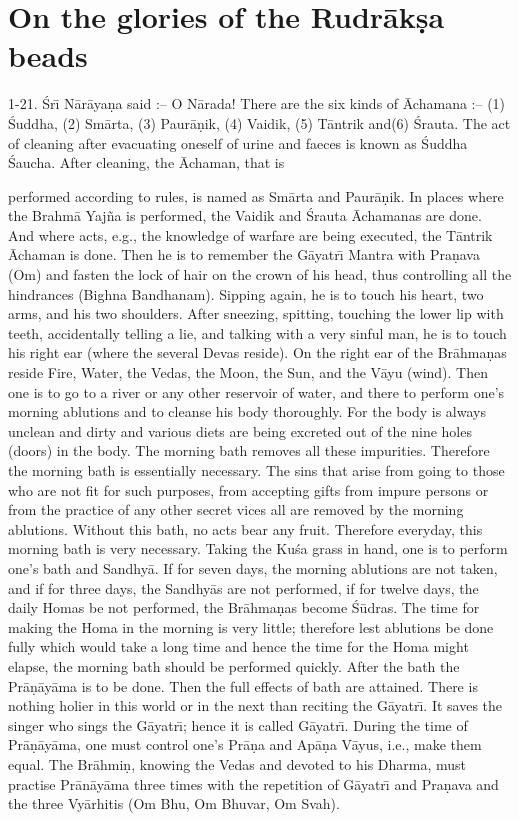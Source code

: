 \chapter{On the glories of the Rudr\=ak\d{s}a beads}

1-21. \'Sr\={\i} N\=ar\=aya\d{n}a said :-- O N\=arada! There are the six kinds of \=Achamana :-- (1) \'Suddha, (2) Sm\=arta, (3) Paur\=a\d{n}ik, (4) Vaidik, (5) T\=antrik and(6) \'Srauta. The act of cleaning after evacuating oneself of urine and faeces is known as \'Suddha \'Saucha. After cleaning, the \=Achaman, that is

performed according to rules, is named as Sm\=arta and Paur\=a\d{n}ik. In places where the Brahm\=a Yaj\~na is performed, the Vaidik and \'Srauta \=Achamanas are done. And where acts, e.g., the knowledge of warfare are being executed, the T\=antrik \=Achaman is done. Then he is to remember the G\=ayatr\={\i} Mantra with Pra\d{n}ava (Om) and fasten the lock of hair on the crown of his head, thus controlling all the hindrances (Bighna Bandhanam). Sipping again, he is to touch his heart, two arms, and his two shoulders. After sneezing, spitting, touching the lower lip with teeth, accidentally telling a lie, and talking with a very sinful man, he is to touch his right ear (where the several Devas reside). On the right ear of the Br\=ahma\d{n}as reside Fire, Water, the Vedas, the Moon, the Sun, and the V\=ayu (wind). Then one is to go to a river or any other reservoir of water, and there to perform one's morning ablutions and to cleanse his body thoroughly. For the body is always unclean and dirty and various diets are being excreted out of the nine holes (doors) in the body. The morning bath removes all these impurities. Therefore the morning bath is essentially necessary. The sins that arise from going to those who are not fit for such purposes, from accepting gifts from impure persons or from the practice of any other secret vices all are removed by the morning ablutions. Without this bath, no acts bear any fruit. Therefore everyday, this morning bath is very necessary. Taking the Ku\'sa grass in hand, one is to perform one's bath and Sandhy\=a. If for seven days, the morning ablutions are not taken, and if for three days, the Sandhy\=as are not performed, if for twelve days, the daily Homas be not performed, the Br\=ahma\d{n}as become \'S\=udras. The time for making the Homa in the morning is very little; therefore lest ablutions be done fully which would take a long time and hence the time for the Homa might elapse, the morning bath should be performed quickly. After the bath the Pr\=a\d{n}\=ay\=ama is to be done. Then the full effects of bath are attained. There is nothing holier in this world or in the next than reciting the G\=ayatr\={\i}. It saves the singer who sings the G\=ayatr\={\i}; hence it is called G\=ayatr\={\i}. During the time of Pr\=a\d{n}\=ay\=ama, one must control one's Pr\=a\d{n}a and Ap\=a\d{n}a V\=ayus, i.e., make them equal. The Br\=ahmi\d{n}, knowing the Vedas and devoted to his Dharma, must practise Pr\=an\=ay\=ama three times with the repetition of G\=ayatr\={\i} and Pra\d{n}ava and the three Vy\=arhitis (Om Bhu, Om Bhuvar, Om Svah).

